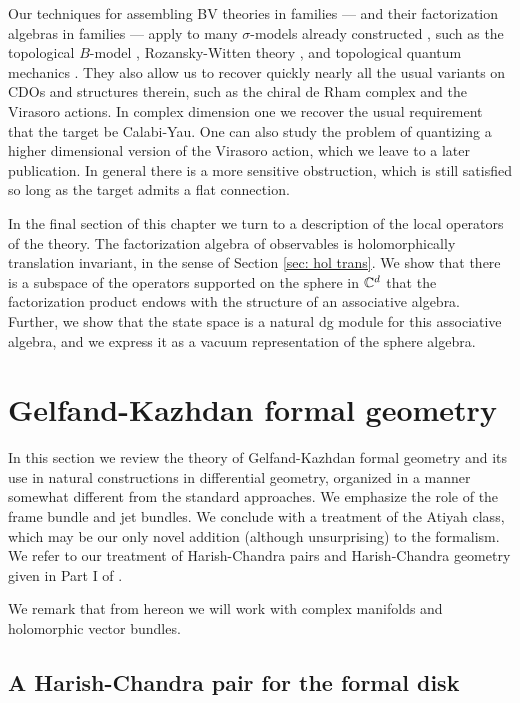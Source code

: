 Our techniques for assembling BV theories in families --- and their factorization algebras in families --- apply to many $\sigma$-models already constructed , such as the topological $B$-model \cite{LiLi}, Rozansky-Witten theory \cite{CLL}, and topological quantum mechanics \cite{GG1, GLL}. 
They also allow us to recover quickly nearly all the usual variants on CDOs and structures therein, such as the chiral de Rham complex and the Virasoro actions.
In complex dimension one we recover the usual requirement that the target be Calabi-Yau.
One can also study the problem of quantizing a higher dimensional version of the Virasoro action, which we leave to a later publication. 
In general there is a more sensitive obstruction, which is still satisfied so long as the target admits a flat connection.

In the final section of this chapter we turn to a description of the local operators of the theory. 
The factorization algebra of observables is holomorphically translation invariant, in the sense of Section \ref{sec: hol trans}.
We show that there is a subspace of the operators supported on the sphere in $\mathbb C^d$ that the factorization product endows with the structure of an associative algebra.
Further, we show that the state space is a natural dg module for this associative algebra, and we express it as a vacuum representation of the sphere algebra. 

\section{Gelfand-Kazhdan formal geometry} \label{sec: gk formal geometry}

In this section we review the theory of Gelfand-Kazhdan formal geometry and its use in natural constructions in differential geometry, organized in a manner somewhat different from the standard approaches.
We emphasize the role of the frame bundle and jet bundles.
We conclude with a treatment of the Atiyah class, which may be our only novel addition (although unsurprising) to the formalism.
We refer to our treatment of Harish-Chandra pairs and Harish-Chandra geometry given in Part I of \cite{GGW}.

We remark that from hereon we will work with complex manifolds and holomorphic vector bundles.
 
\subsection{A Harish-Chandra pair for the formal disk}

